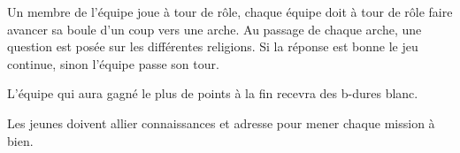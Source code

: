 \documentclass{grand-jeu}
\begin{document}
\begin{liste-materiel}
\end{liste-materiel}

\begin{regles}
Un membre de l'équipe joue à tour de rôle, chaque équipe doit à tour de rôle faire avancer sa boule d'un coup vers une arche. Au passage de chaque arche, une question est posée sur les différentes religions. Si la réponse est bonne le jeu continue, sinon l'équipe passe son tour.

L’équipe qui aura gagné le plus de points à la fin recevra des b-dures blanc.
\end{regles}

\begin{imaginaire}
Les jeunes doivent allier connaissances et adresse pour mener chaque mission à bien. 
\end{imaginaire}

\begin{moments-stop}
\end{moments-stop}
\end{document}
